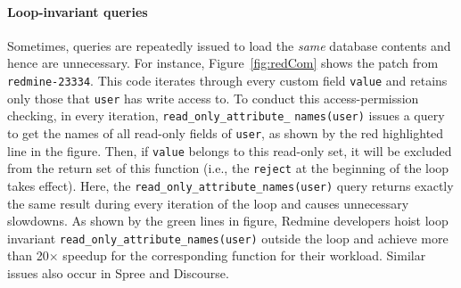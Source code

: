 \paragraph{\bf{Loop-invariant queries}}
Sometimes, queries are repeatedly issued to load the {\it same} database contents and hence are unnecessary. 
%
For instance, Figure~\ref{fig:redCom} shows the patch from \texttt{redmine-23334}.
This code iterates through every custom field 
\texttt{value} %
and retains only those that 
\texttt{user} has write access to.
To conduct this access-permission checking, in every iteration, \texttt{read\_only\_attribute\_}
\texttt{names(user)} issues a query to get the names of all read-only fields of \texttt{user}, as shown by the red highlighted line
in the figure. Then, if
\texttt{value} belongs to this read-only set, it will be excluded from the return set of this function (i.e., the \texttt{reject} at the beginning of the loop takes effect). Here, the \texttt{read\_only\_attribute\_names(user)} query 
returns exactly the same result during every iteration of the loop and causes
unnecessary slowdowns. 
As shown by the green lines in figure, Redmine developers hoist loop invariant \texttt{read\_only\_attribute\_names(user)} outside the loop and achieve more than 20$\times$ speedup for the corresponding function for their workload.
Similar issues also occur in Spree and Discourse.





\vspace{-0.08in} 
